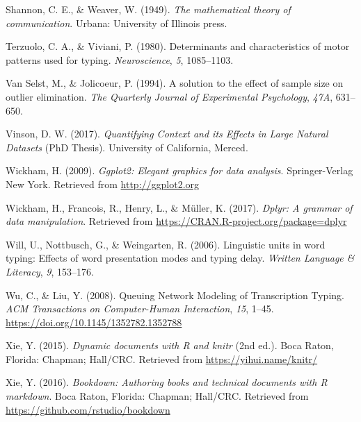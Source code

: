 \documentclass[,man,donotrepeattitle,floatsintext]{apa6}
\begin{document}
\leavevmode\hypertarget{ref-Shannonmathematicaltheorycommunication1949}{}%
Shannon, C. E., \& Weaver, W. (1949). \emph{The mathematical theory of communication}. Urbana: University of Illinois press.

\leavevmode\hypertarget{ref-terzuolo_determinants_1980}{}%
Terzuolo, C. A., \& Viviani, P. (1980). Determinants and characteristics of motor patterns used for typing. \emph{Neuroscience}, \emph{5}, 1085--1103.

\leavevmode\hypertarget{ref-van_selst_solution_1994}{}%
Van Selst, M., \& Jolicoeur, P. (1994). A solution to the effect of sample size on outlier elimination. \emph{The Quarterly Journal of Experimental Psychology}, \emph{47A}, 631--650.

\leavevmode\hypertarget{ref-vinson_quantifying_2017}{}%
Vinson, D. W. (2017). \emph{Quantifying Context and its Effects in Large Natural Datasets} (PhD Thesis). University of California, Merced.

\leavevmode\hypertarget{ref-R-ggplot2}{}%
Wickham, H. (2009). \emph{Ggplot2: Elegant graphics for data analysis}. Springer-Verlag New York. Retrieved from \url{http://ggplot2.org}

\leavevmode\hypertarget{ref-R-dplyr}{}%
Wickham, H., Francois, R., Henry, L., \& Müller, K. (2017). \emph{Dplyr: A grammar of data manipulation}. Retrieved from \url{https://CRAN.R-project.org/package=dplyr}

\leavevmode\hypertarget{ref-will_linguistic_2006}{}%
Will, U., Nottbusch, G., \& Weingarten, R. (2006). Linguistic units in word typing: Effects of word presentation modes and typing delay. \emph{Written Language \& Literacy}, \emph{9}, 153--176.

\leavevmode\hypertarget{ref-wu_queuing_2008}{}%
Wu, C., \& Liu, Y. (2008). Queuing Network Modeling of Transcription Typing. \emph{ACM Transactions on Computer-Human Interaction}, \emph{15}, 1--45. \url{https://doi.org/10.1145/1352782.1352788}

\leavevmode\hypertarget{ref-R-knitr}{}%
Xie, Y. (2015). \emph{Dynamic documents with R and knitr} (2nd ed.). Boca Raton, Florida: Chapman; Hall/CRC. Retrieved from \url{https://yihui.name/knitr/}

\leavevmode\hypertarget{ref-R-bookdown}{}%
Xie, Y. (2016). \emph{Bookdown: Authoring books and technical documents with R markdown}. Boca Raton, Florida: Chapman; Hall/CRC. Retrieved from \url{https://github.com/rstudio/bookdown}

\endgroup
\end{document}
